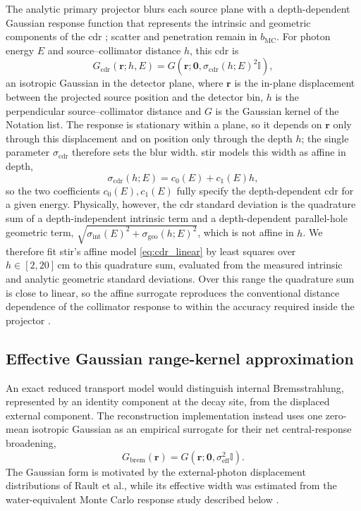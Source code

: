 The analytic primary projector blurs each source plane with a depth-dependent Gaussian response function that represents the intrinsic and geometric components of the \gls{cdr} \cite{fusterIntegrationAdvanced3D2013}; scatter and penetration remain in $b_{\mathrm{MC}}$. For photon energy $E$ and source--collimator distance $h$, this \gls{cdr} is
\begin{equation}
    G_{\mathrm{cdr}}(\mathbf r;h,E)=
    G\!\left(\mathbf r;\mathbf 0,
    \sigma_{\mathrm{cdr}}(h;E)^2\mathbb I\right),
    \label{eq:cdr_psf}
\end{equation}
an isotropic Gaussian in the detector plane, where $\mathbf r$ is the in-plane displacement between the projected source position and the detector bin, $h$ is the perpendicular source--collimator distance and $G$ is the Gaussian kernel of the Notation list. The response is stationary within a plane, so it depends on $\mathbf r$ only through this displacement and on position only through the depth $h$; the single parameter $\sigma_{\mathrm{cdr}}$ therefore sets the blur width. \gls{stir} models this width as affine in depth,
\begin{equation}
    \sigma_{\mathrm{cdr}}(h;E)=c_0(E)+c_1(E)h,
    \label{eq:cdr_linear}
\end{equation}
so the two coefficients $c_0(E),c_1(E)$ fully specify the depth-dependent \gls{cdr} for a given energy. Physically, however, the \gls{cdr} standard deviation is the quadrature sum of a depth-independent intrinsic term and a depth-dependent parallel-hole geometric term, $\sqrt{\sigma_{\mathrm{int}}(E)^2+\sigma_{\mathrm{geo}}(h;E)^2}$, which is not affine in $h$. We therefore fit \gls{stir}'s affine model \eqref{eq:cdr_linear} by least squares over $h\in[2,20]\,\mathrm{cm}$ to this quadrature sum, evaluated from the measured intrinsic and analytic geometric standard deviations. Over this range the quadrature sum is close to linear, so the affine surrogate reproduces the conventional distance dependence of the collimator response to within the accuracy required inside the projector \cite{angerSensitivityResolutionLinearity1966}.

\subsection{Effective Gaussian range-kernel approximation}
\label{subsec:brem_specific_blur}

An exact reduced transport model would distinguish internal Bremsstrahlung, represented by an identity component at the decay site, from the displaced external component. The reconstruction implementation instead uses one zero-mean isotropic Gaussian as an empirical surrogate for their net central-response broadening,
\begin{equation}
    G_{\mathrm{brem}}(\mathbf r)=
    G\!\left(\mathbf r;\mathbf 0,
    \sigma_{\mathrm{eff}}^2\mathbb I\right).
    \label{eq:brem}
\end{equation}
The Gaussian form is motivated by the external-photon displacement distributions of Rault et al., while its effective width was estimated from the water-equivalent Monte Carlo response study described below \cite{raultFastSimulationYttrium902010}.

